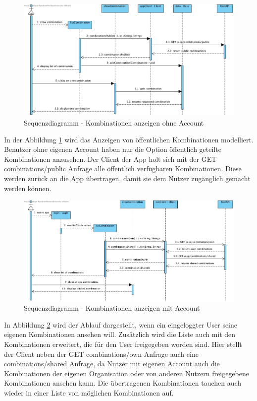 \begin{figure}[h]
	\centering
	\includegraphics[width=\textwidth]{sequenzdiagramm/ShowCombinationohneAcc}
	\caption{Sequenzdiagramm - Kombinationen anzeigen ohne Account}
	\label{fig:sequenz-appohneaccount}
\end{figure}
\FloatBarrier
In der Abbildung \ref{fig:sequenz-appohneaccount} wird das Anzeigen von öffentlichen Kombinationen modelliert. Benutzer ohne eigenen Account haben nur die Option öffentlich geteilte Kombinationen anzusehen. Der Client der App holt sich mit der GET combinations/public Anfrage alle öffentlich verfügbaren Kombinationen. Diese werden zurück an die App übertragen, damit sie dem Nutzer zugänglich gemacht werden können.

\begin{figure}[h]
	\centering
	\includegraphics[width=\textwidth]{sequenzdiagramm/ShowCombinationWithAcc}
	\caption{Sequenzdiagramm - Kombinationen anzeigen mit Account}
	\label{fig:sequenz-ShowMitAccount}
\end{figure}
\FloatBarrier
In Abbildung \ref{fig:sequenz-ShowMitAccount} wird der Ablauf dargestellt, wenn ein eingeloggter User seine eigenen Kombinationen ansehen will. Zusätzlich wird die Liste auch mit den Kombinationen erweitert, die für den User freigegeben worden sind. Hier stellt der Client neben der GET combinations/own Anfrage auch eine combinations/shared Anfrage, da Nutzer mit eigenen Account auch die Kombinationen der eigenen Organisation oder von anderen Nutzern freigegebene Kombinationen ansehen kann. Die übertragenen Kombinationen tauchen auch wieder in einer Liste von möglichen Kombinationen auf.

